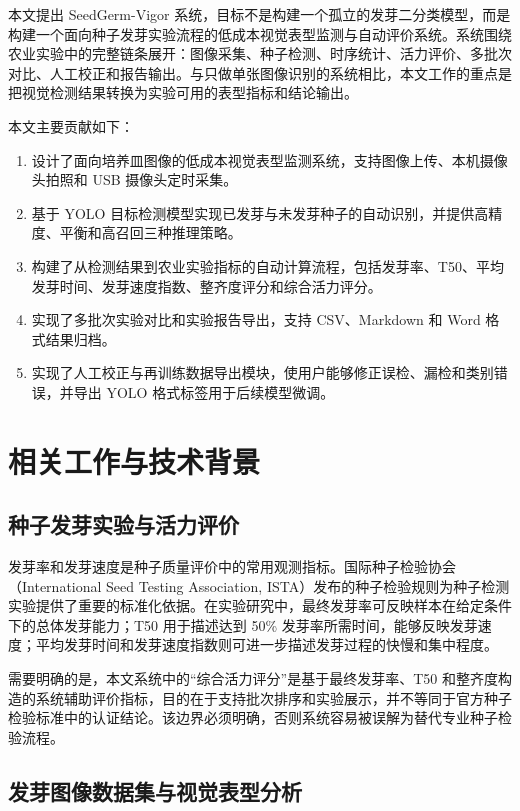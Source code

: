 \documentclass[UTF8,a4paper,zihao=-4]{ctexart}
\begin{document}
本文提出 SeedGerm-Vigor 系统，目标不是构建一个孤立的发芽二分类模型，而是构建一个面向种子发芽实验流程的低成本视觉表型监测与自动评价系统。系统围绕农业实验中的完整链条展开：图像采集、种子检测、时序统计、活力评价、多批次对比、人工校正和报告输出。与只做单张图像识别的系统相比，本文工作的重点是把视觉检测结果转换为实验可用的表型指标和结论输出。

本文主要贡献如下：
\begin{enumerate}
  \item 设计了面向培养皿图像的低成本视觉表型监测系统，支持图像上传、本机摄像头拍照和 USB 摄像头定时采集。
  \item 基于 YOLO 目标检测模型实现已发芽与未发芽种子的自动识别，并提供高精度、平衡和高召回三种推理策略。
  \item 构建了从检测结果到农业实验指标的自动计算流程，包括发芽率、T50、平均发芽时间、发芽速度指数、整齐度评分和综合活力评分。
  \item 实现了多批次实验对比和实验报告导出，支持 CSV、Markdown 和 Word 格式结果归档。
  \item 实现了人工校正与再训练数据导出模块，使用户能够修正误检、漏检和类别错误，并导出 YOLO 格式标签用于后续模型微调。
\end{enumerate}

\section{相关工作与技术背景}

\subsection{种子发芽实验与活力评价}

发芽率和发芽速度是种子质量评价中的常用观测指标。国际种子检验协会（International Seed Testing Association, ISTA）发布的种子检验规则为种子检测实验提供了重要的标准化依据\cite{ista_rules}。在实验研究中，最终发芽率可反映样本在给定条件下的总体发芽能力；T50 用于描述达到 50\% 发芽率所需时间，能够反映发芽速度；平均发芽时间和发芽速度指数则可进一步描述发芽过程的快慢和集中程度。

需要明确的是，本文系统中的“综合活力评分”是基于最终发芽率、T50 和整齐度构造的系统辅助评价指标，目的在于支持批次排序和实验展示，并不等同于官方种子检验标准中的认证结论。该边界必须明确，否则系统容易被误解为替代专业种子检验流程。

\subsection{发芽图像数据集与视觉表型分析}
\end{document}
